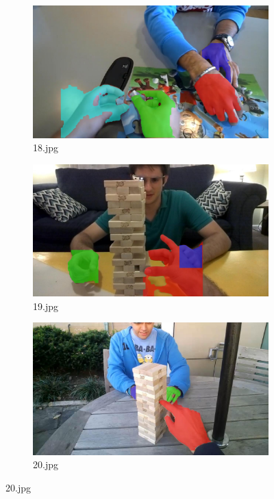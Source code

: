 \begin{figure}[!h]
\begin{subfigure}[b]{0.3\textwidth}
    \end{subfigure}
    \hfill
    \begin{subfigure}[b]{0.3\textwidth}
        \centering
        \includegraphics[width=\textwidth]{images/handSegmentation/18.jpg}
        \caption{18.jpg}
        
    \end{subfigure}
       
    \begin{subfigure}[b]{0.3 \textwidth}
        \centering
        \includegraphics[width=\textwidth]{images/handSegmentation/19.jpg}
        \caption{19.jpg}
        
    \end{subfigure}
    \hfill
    \begin{subfigure}[b]{0.3\textwidth}
        \centering
        \includegraphics[width=\textwidth]{images/handSegmentation/20.jpg}
        \caption{20.jpg}
        

\end{subfigure}
\end{figure}
